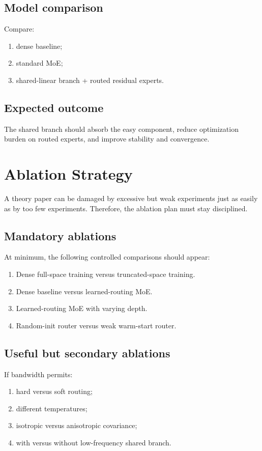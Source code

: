 \documentclass[11pt]{article}
\begin{document}
\subsection{Model comparison}

Compare:
\begin{enumerate}[leftmargin=2em]
    \item dense baseline;
    \item standard MoE;
    \item shared-linear branch + routed residual experts.
\end{enumerate}

\subsection{Expected outcome}

The shared branch should absorb the easy component, reduce optimization burden on routed experts, and improve stability and convergence.

\section{Ablation Strategy}

A theory paper can be damaged by excessive but weak experiments just as easily as by too few experiments. Therefore, the ablation plan must stay disciplined.

\subsection{Mandatory ablations}

At minimum, the following controlled comparisons should appear:
\begin{enumerate}[leftmargin=2em]
    \item Dense full-space training versus truncated-space training.
    \item Dense baseline versus learned-routing MoE.
    \item Learned-routing MoE with varying depth.
    \item Random-init router versus weak warm-start router.
\end{enumerate}

\subsection{Useful but secondary ablations}

If bandwidth permits:
\begin{enumerate}[leftmargin=2em]
    \item hard versus soft routing;
    \item different temperatures;
    \item isotropic versus anisotropic covariance;
    \item with versus without low-frequency shared branch.
\end{enumerate}
\end{document}
